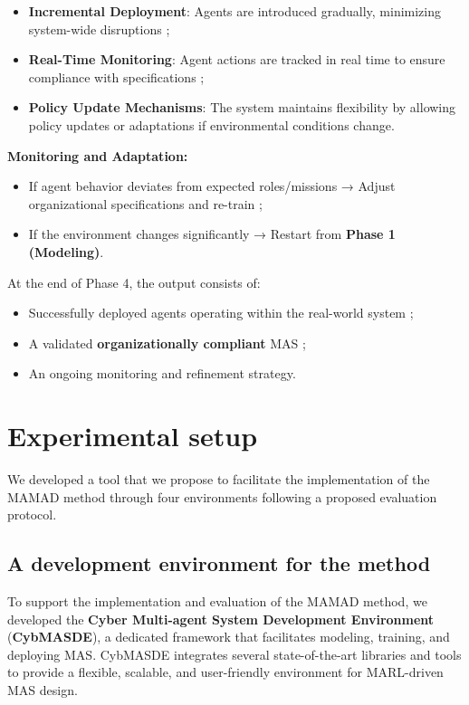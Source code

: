 \documentclass[journal]{IEEEtai}
\begin{document}
\begin{itemize}
    \item \textbf{Incremental Deployment}: Agents are introduced gradually, minimizing system-wide disruptions ;
    \item \textbf{Real-Time Monitoring}: Agent actions are tracked in real time to ensure compliance with specifications ;
    \item \textbf{Policy Update Mechanisms}: The system maintains flexibility by allowing policy updates or adaptations if environmental conditions change.
\end{itemize}

\noindent \textbf{Monitoring and Adaptation:}
\begin{itemize}
    \item If agent behavior deviates from expected roles/missions → Adjust organizational specifications and re-train ;
    \item If the environment changes significantly → Restart from \textbf{Phase 1 (Modeling)}.
\end{itemize}

At the end of Phase 4, the output consists of:
\begin{itemize}
    \item Successfully deployed agents operating within the real-world system ;
    \item A validated \textbf{organizationally compliant} MAS ;
    \item An ongoing monitoring and refinement strategy.
\end{itemize}


\clearpage


\section{Experimental setup}
\label{sec:experimental_setup}

We developed a tool that we propose to facilitate the implementation of the MAMAD method through four environments following a proposed evaluation protocol.

\subsection{A development environment for the method}

To support the implementation and evaluation of the MAMAD method, we developed the \textbf{Cyber Multi-agent System Development Environment} (\textbf{CybMASDE}), a dedicated framework that facilitates modeling, training, and deploying MAS. CybMASDE integrates several state-of-the-art libraries and tools to provide a flexible, scalable, and user-friendly environment for MARL-driven MAS design.
\end{document}
